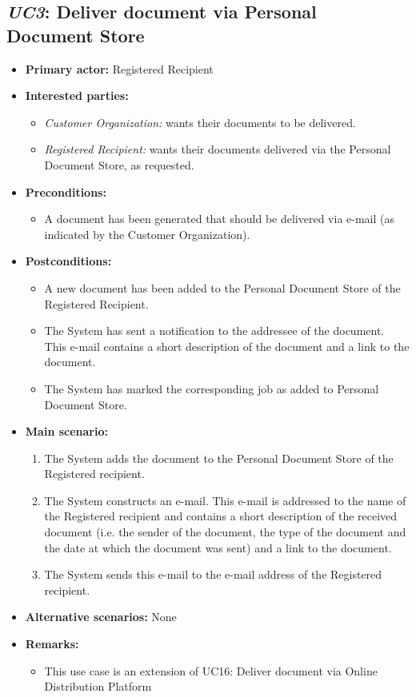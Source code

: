 \documentclass[a4paper,10pt]{article}
\begin{document}
\subsection{\emph{UC3}: Deliver document via Personal Document Store}
\begin{itemize}
	\item \textbf{Primary actor:} Registered Recipient
	\item \textbf{Interested parties:} 
	\begin{itemize}
		\item \textit{Customer Organization:} wants their documents to be delivered.
        \item \textit{Registered Recipient:} wants their documents delivered via the Personal Document Store, as requested.
	\end{itemize}
	
	\item \textbf{Preconditions:}
	\begin{itemize}
		\item A document has been generated that should be delivered via e-mail (as indicated by the Customer Organization).
	\end{itemize}
	
	\item \textbf{Postconditions:}
	\begin{itemize}
		\item A new document has been added to the Personal Document Store of the Registered Recipient.
		\item The System has sent a notification to the addressee of the document. This e-mail contains a short description of the document and a link to the document.
		\item The System has marked the corresponding job as added to Personal Document Store.
	\end{itemize}
	
	\item \textbf{Main scenario:} 
	\begin{enumerate}
		\item The System adds the document to the Personal Document Store of the Registered recipient.
		\item The System constructs an e-mail. This e-mail is addressed to the name of the Registered recipient and contains a short description of the received document (i.e. the sender of the document, the type of the document and the date at which the document was sent) and a link to the document.
		\item The System sends this e-mail to the e-mail address of the Registered recipient.
	\end{enumerate}
	
	\item \textbf{Alternative scenarios:} 
	None
	
	\item \textbf{Remarks:}
	\begin{itemize}
		\item  This use case is an extension of UC16: Deliver document via Online Distribution Platform
	\end{itemize}
\end{itemize}
\end{document}
